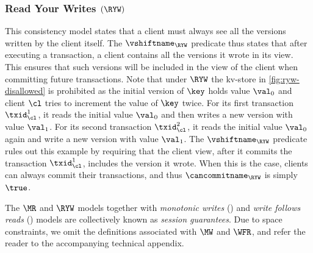 
\subsubsection{Read Your Writes $(\RYW)$}
This consistency model states that a client must always see all the versions written by the client itself. 
The $\vshiftname_{\RYW}$ predicate thus states that after executing a transaction, a client 
contains all the versions it wrote in its view. This ensures that such versions will be included in the view of the client 
when committing future transactions.
Note that under $\RYW$ the kv-store in \cref{fig:ryw-disallowed} is prohibited as
the initial version of $\key$ holds value $\val_0$ 
and client $\cl$ tries to increment the value of $\key$ twice.  
For its first transaction \( \txid_{\cl}^1\), it reads the initial value $\val_0$ and then writes a new version with value $\val_1$. 
For its second transaction \( \txid_{\cl}^2\), it reads the initial value $\val_0$ again and write a new version with value $\val_1$.
The $\vshiftname_{\RYW}$ predicate rules out this example by requiring that
the client view, after it commits the transaction  \(\txid_{\cl}^{1}\), includes the version it wrote.  
When this is the case, clients can always commit their transactions, and thus $\cancommitname_{\RYW}$ is simply $\true$.

The $\MR$ and $\RYW$ models together with \emph{monotonic writes} (\MW) and \emph{write follows reads} (\WFR) models  are collectively known as \emph{session guarantees}. 
Due to space constraints, we omit the definitions associated with $\MW$ and $\WFR$, and refer the reader to the accompanying technical appendix. 


